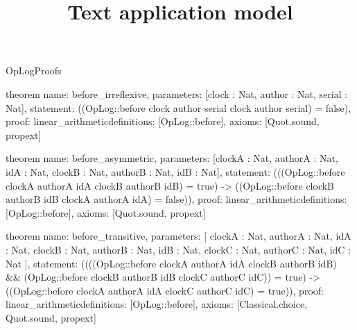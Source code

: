 \begin{lexlean}{OpLogProofs}
\title{Text application model}
\begin{semanticmodule}
theorem{
  name: before_irreflexive,
  parameters: [clock : Nat, author : Nat, serial : Nat],
  statement: ((OpLog::before clock author serial clock author serial) = false),
  proof: linear_arithmetic{definitions: [OpLog::before]},
  axioms: [Quot.sound, propext]
}

theorem{
  name: before_asymmetric,
  parameters: [clockA : Nat, authorA : Nat, idA : Nat, clockB : Nat, authorB : Nat, idB : Nat],
  statement: (((OpLog::before clockA authorA idA clockB authorB idB) = true) -> ((OpLog::before clockB authorB idB clockA authorA idA) = false)),
  proof: linear_arithmetic{definitions: [OpLog::before]},
  axioms: [Quot.sound, propext]
}

theorem{
  name: before_transitive,
  parameters: [
    clockA : Nat,
    authorA : Nat,
    idA : Nat,
    clockB : Nat,
    authorB : Nat,
    idB : Nat,
    clockC : Nat,
    authorC : Nat,
    idC : Nat
  ],
  statement: ((((OpLog::before clockA authorA idA clockB authorB idB) && (OpLog::before clockB authorB idB clockC authorC idC)) = true) -> ((OpLog::before clockA authorA idA clockC authorC idC) = true)),
  proof: linear_arithmetic{definitions: [OpLog::before]},
  axioms: [Classical.choice, Quot.sound, propext]
}
\end{semanticmodule}
\end{lexlean}
